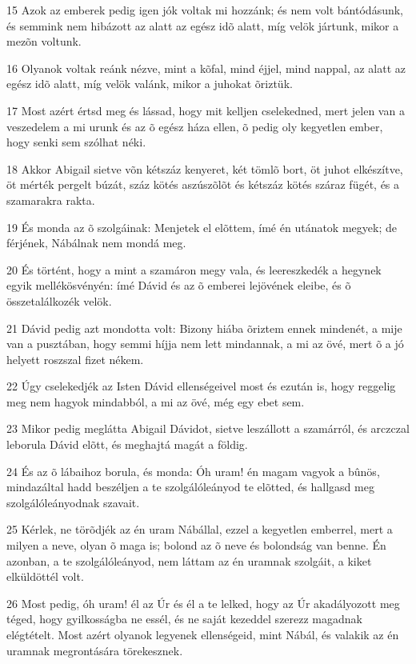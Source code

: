 \par 15 Azok az emberek pedig igen jók voltak mi hozzánk; és nem volt bántódásunk, és semmink nem hibázott az alatt az egész idõ alatt, míg velök jártunk, mikor a mezõn voltunk.
\par 16 Olyanok voltak reánk nézve, mint a kõfal, mind éjjel, mind nappal, az alatt az egész idõ alatt, míg velök valánk, mikor a juhokat õriztük.
\par 17 Most azért értsd meg és lássad, hogy mit kelljen cselekedned, mert jelen van a veszedelem a mi urunk és az õ egész háza ellen, õ pedig oly kegyetlen ember, hogy senki sem szólhat néki.
\par 18 Akkor Abigail sietve võn kétszáz kenyeret, két tömlõ bort, öt juhot elkészítve, öt mérték pergelt búzát, száz kötés aszúszõlõt és kétszáz kötés száraz fügét, és a szamarakra rakta.
\par 19 És monda az õ szolgáinak: Menjetek el elõttem, ímé én utánatok megyek; de férjének, Nábálnak nem mondá meg.
\par 20 És történt, hogy a mint a szamáron megy vala, és leereszkedék a hegynek egyik mellékösvényén: ímé Dávid és az õ emberei lejövének eleibe, és õ összetalálkozék velök.
\par 21 Dávid pedig azt mondotta volt: Bizony hiába õriztem ennek mindenét, a mije van a pusztában, hogy semmi híjja nem lett mindannak, a mi az övé, mert õ a jó helyett roszszal fizet nékem.
\par 22 Úgy cselekedjék az Isten Dávid ellenségeivel most és ezután is, hogy reggelig meg nem hagyok mindabból, a mi az övé, még egy ebet sem.
\par 23 Mikor pedig meglátta Abigail Dávidot, sietve leszállott a szamárról, és arczczal leborula Dávid elõtt, és meghajtá magát a földig.
\par 24 És az õ lábaihoz borula, és monda: Óh uram! én magam vagyok a bûnös, mindazáltal hadd beszéljen a te szolgálóleányod te elõtted, és hallgasd meg szolgálóleányodnak szavait.
\par 25 Kérlek, ne törõdjék az én uram Nábállal, ezzel a kegyetlen emberrel, mert a milyen a neve, olyan õ maga is; bolond az õ neve és bolondság van benne. Én azonban, a te szolgálóleányod, nem láttam az én uramnak szolgáit, a kiket elküldöttél volt.
\par 26 Most pedig, óh uram! él az Úr és él a te lelked, hogy az Úr akadályozott meg téged, hogy gyilkosságba ne essél, és ne saját kezeddel szerezz magadnak elégtételt. Most azért olyanok legyenek ellenségeid, mint Nábál, és valakik az én uramnak megrontására törekesznek.

